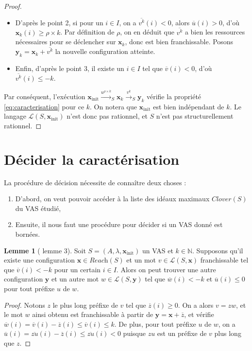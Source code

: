 \documentclass[a4paper,final]{article}
\theoremstyle{definition}
\newtheorem{Lemma}[Theorem]{Lemme}
\let\leq\leqslant
\let\geq\geqslant
\newcommand{\N}{\ensuremath{\mathbb{N}}}
\newcommand{\lang}{\ensuremath{\mathcal{L}}}
\newcommand{\reach}{\ensuremath{\textit{Reach}}}
\newcommand{\clover}{\textit{Clover}}
\newcommand{\trans}[2]{\ensuremath{\stackrel{#1}{\longrightarrow}_{#2}}}
\newcommand{\vect}[1]{\ensuremath{\mathbf{#1}}}
\newcommand{\xinit}{\ensuremath{\vect{x}_\text{init}}}
\newcommand{\valeur}[1]{\ensuremath{\overline{#1}}}
\begin{document}
\begin{proof}
\begin{itemize}
    \item D'après le point 2, si pour un $i\in I$, on a $\valeur{v^k}(i) < 0$, alors $\valeur{u}(i) > 0$, d'où $\vect{x}_k(i) \geq \rho\times k$.
    Par définition de $\rho$, on en déduit que $\valeur{v^k}$ a bien les ressources nécessaires pour se déclencher sur $\vect{x}_k$, donc est bien franchissable.
    Posons $\vect{y}_k = \vect{x}_k + \valeur{v^k}$ la nouvelle configuration atteinte.
    
    \item Enfin, d'après le point 3, il existe un $i\in I$ tel que $\valeur{v}(i) < 0$, d'où $\valeur{v^k}(i) \leq -k$.
\end{itemize}
Par conséquent, l'exécution $\xinit \trans{u^{\rho\times k}}{S} \vect{x}_k \trans{v^k}{S} \vect{y}_k$ vérifie la propriété \eqref{eq:caracterisation} pour ce $k$.
On notera que $\xinit$ est bien indépendant de $k$.
Le langage $\lang(S,\xinit)$ n'est donc pas rationnel, et $S$ n'est pas structurellement rationnel.
\end{proof}



\section{Décider la caractérisation}

La procédure de décision nécessite de connaître deux choses :
\begin{enumerate}
    \item D'abord, on veut pouvoir accéder à la liste des idéaux maximaux $\clover(S)$ du VAS étudié,
    \item Ensuite, il nous faut une procédure pour décider si un VAS donné est bornées.
\end{enumerate}

\begin{Lemma}[\cite{giyo80} lemme 3]\label{mot décroissant}
    Soit $S=(A,\lambda,\xinit)$ un VAS et $k\in\N$.
    Supposons qu'il existe une configuration $\vect{x}\in \reach(S)$ et un mot $v\in\lang(S,\vect{x})$ franchissable tel que $\valeur{v}(i) < -k$ pour un certain $i \in I$.
    Alors on peut trouver une autre configuration $\vect{y}$ et un autre mot $w\in\lang(S,\vect{y})$ tel que $\valeur{w}(i) < -k$ et $\valeur{u}(i) \leq 0$ pour tout préfixe $u$ de $w$.
\end{Lemma}

\begin{proof}
Notons $z$ le plus long préfixe de $v$ tel que $\valeur{z}(i) \geq 0$.
On a alors $v = zw$, et le mot $w$ ainsi obtenu est franchissable à partir de $\vect{y} = \vect{x} + \valeur{z}$, 
et vérifie $\valeur{w}(i) = \valeur{v}(i) - \valeur{z}(i) \leq \valeur{v}(i) \leq k$.
De plus, pour tout préfixe $u$ de $w$, on a $\valeur{u}(i) = \valeur{zu}(i) - \valeur{z}(i) \leq \valeur{zu}(i) < 0$ puisque $zu$ est un préfixe de $v$ plus long que $z$.
\end{proof}
\end{document}
